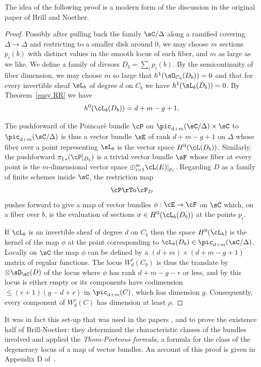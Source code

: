 The idea of the following proof is a modern form of the discussion in the original paper of Brill and Noether. 

\begin{proof}  Possibly after pulling back the family $\sC/\Delta$ along a ramified covering $\Delta\to \Delta$
and restricting to a smaller disk around 0, we may choose $m$ sections
$p_{i}(b)$ with distinct values in the smooth locus of each fiber, and $m$ as large as we like. We 
define a family of divsors $D_{b} = \sum_{i}p_{i}(b)$.
By the semicontinuity of fiber dimension, we may choose $m$ so large that $h^{1}(\sO_{C_{b}}(D_{b})) = 0$
and that for every invertible sheaf $\sL_{b}$ of degree $d$ on $C_{b}$ we have
$h^{1}(\sL_{b}(D_{b})) = 0$. 
By Theorem~\ref{easy RR} we have
$$
h^0(\cL_{b}(D_{b})) =  d+m - g + 1.
$$

The pushforward of the Poincar\'e bundle $\cP$ on $\pic_{d+m}(\sC/\Delta) \times \sC$ to $\pic_{d+m}(\sC/\Delta)$ is thus a vector
bundle $\sE$ of rank $d + m - g + 1$ on $\Delta$ whose fiber over a point representing $\sL_{b}$ is the vector space $H^0(\cL(D_{b}))$. Similarly,
the pushforward 
${\pi_1}_*(\cP|_{D_{b}})$
is a trivial vector bundle $\sF$ whose fiber at every point is the $m$-dimensional vector space $\oplus_{i = 1}^{m} \cL(E)|_{p_i}$. Regarding $D$ as a family of finite schemes inside $\sC$, the restriction map
$$
\cP  \rTo \cP_{D}
$$
pushes forward to give a map of vector bundles $\phi : \cE \to \cF$ on $\sC$ which, on a fiber over $b$, is the evaluation of sections $\sigma \in H^0(\cL_{b}(D_{b}))$ at the points $p_i$.

If $\cL_{b}$ is an invertible sheaf of degree $d$ on $C_{b}$ then the space $H^0(\cL_{b})$ is the kernel of the map $\phi$ at the point corresponding to $\cL_{b}(D_{b}) \in \pic_{d+m}(\sC/\Delta)$. Locally on $\sC$ the map $\phi$ can be defined by a $(d+m) \times (d+m-g+1)$ matrix of regular functions. The locus $W^r_d(C_{b})$ is 
thus the translate
by $\otimes \sO_{\sC}(D)$ of the locus where $\phi$ has rank $d+m-g-r$ or less, and by \cite[Exercise 10.9]{Eisenbud1995} this locus is either empty or its components have codimension $\leq (r+1)(g-d+r)$ in $\pic_{d+m}(C)$, which has dimension $g$. Consequently, every component of $W^r_d(C)$ has dimension at least $\rho$. 
\end{proof}

It was in fact this set-up that was used in the papers \cite{MR323792}, \cite{MR0357398} and \cite{Kempf} to prove the existence half of Brill-Noether: they determined the characteristic classes of the bundles involved and applied the \emph{Thom-Porteous formula}, a formula for the class of the degeneracy locus of a map of vector bundles. An account of this proof is given in Appendix D of~\cite{3264}.

